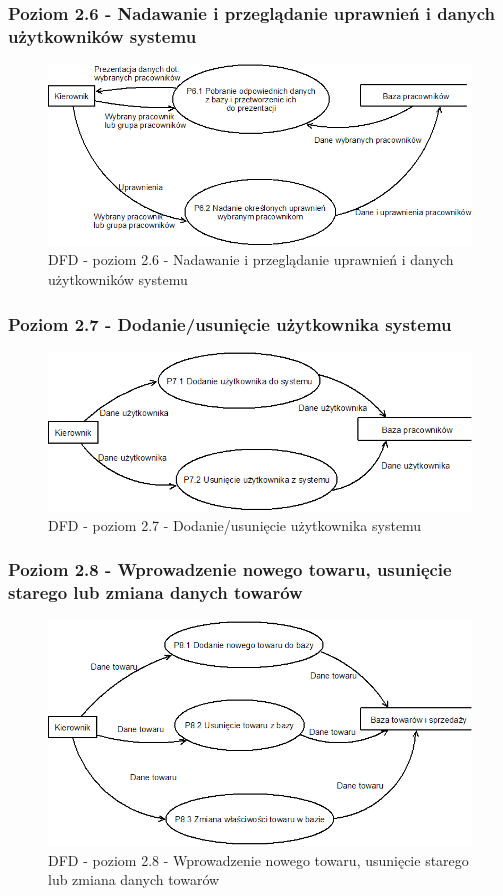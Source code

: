 \subsubsection{Poziom 2.6 - Nadawanie i przeglądanie uprawnień i danych użytkowników systemu}
\begin{figure}[h]
\includegraphics[width=1\textwidth]{gfx/dfd-2-6.png}
\caption{DFD - poziom 2.6 - Nadawanie i przeglądanie uprawnień i danych użytkowników systemu}
\end{figure}
\clearpage
\subsubsection{Poziom 2.7 - Dodanie/usunięcie użytkownika systemu}
\begin{figure}[h]
\includegraphics[width=1\textwidth]{gfx/dfd-2-7.png}
\caption{DFD - poziom 2.7 - Dodanie/usunięcie użytkownika systemu}
\end{figure}
\clearpage
\subsubsection{Poziom 2.8 - Wprowadzenie nowego towaru, usunięcie starego lub zmiana danych towarów}
\begin{figure}[h]
\includegraphics[width=1\textwidth]{gfx/dfd-2-8.png}
\caption{DFD - poziom 2.8 - Wprowadzenie nowego towaru, usunięcie starego lub zmiana danych towarów}
\end{figure}
\clearpage
